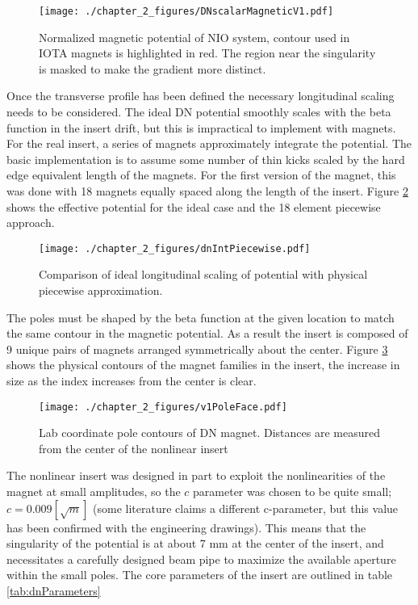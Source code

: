 \begin{figure}
	\centering
	\texttt{[image: ./chapter\_2\_figures/DNscalarMagneticV1.pdf]}
	\caption{Normalized magnetic potential of NIO system, contour used in IOTA magnets is highlighted in red. The region near the singularity is masked to make the gradient more distinct.}
	\label{fig:dnMagPtCurve}
\end{figure}

Once the transverse profile has been defined the necessary longitudinal scaling needs to be considered. The ideal DN potential smoothly scales with the beta function in the insert drift, but this is impractical to implement with magnets. For the real insert, a series of magnets approximately integrate the potential. The basic implementation is to assume some number of thin kicks scaled by the hard edge equivalent length of the magnets. For the first version of the magnet, this was done with 18 magnets equally spaced along the length of the insert. Figure \ref{fig:dnLongKick} shows the effective potential for the ideal case and the 18 element piecewise approach. 

\begin{figure}
	\centering
	\texttt{[image: ./chapter\_2\_figures/dnIntPiecewise.pdf]}
	\caption{Comparison of ideal longitudinal scaling of potential with physical piecewise approximation.}
	\label{fig:dnLongKick}
\end{figure}


The poles must be shaped by the beta function at the given location to match the same contour in the magnetic potential. As a result the insert is composed of 9 unique pairs of magnets arranged symmetrically about the center. Figure \ref{fig:labPoles} shows the physical contours of the magnet families in the insert, the increase in size as the index increases from the center is clear. 

\begin{figure}
	\centering
	\texttt{[image: ./chapter\_2\_figures/v1PoleFace.pdf]}
	\caption{Lab coordinate pole contours of DN magnet. Distances are measured from the center of the nonlinear insert}
	\label{fig:labPoles}
\end{figure}

The nonlinear insert was designed in part to exploit the nonlinearities of the magnet at small amplitudes, so the $c$ parameter was chosen to be quite small; $c=0.009 [\sqrt{m}]$ (some literature claims a different c-parameter, but this value has been confirmed with the engineering drawings). This means that the singularity of the potential is at about 7 mm at the center of the insert, and necessitates a carefully designed beam pipe to maximize the available aperture within the small poles. The core parameters of the insert are outlined in table \ref{tab:dnParameters}

